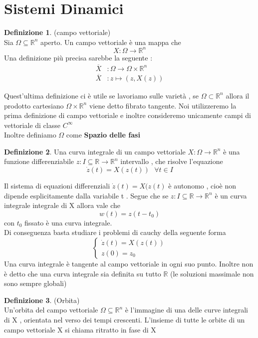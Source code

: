 \documentclass{article}
\theoremstyle{definition}
\newtheorem{definizione}{Definizione}[section]
\newcommand{\R}{\mathbb{R}}
\newcommand{\Rn}{\R^n}
\begin{document}
\section{Sistemi Dinamici}
\begin{definizione}(campo vettoriale)\\
	Sia $\Omega \subseteq \Rn$ aperto. Un campo vettoriale è una mappa che $$X:\Omega \rightarrow \Rn$$
	Una definizione più precisa sarebbe la seguente :
	\begin{align*}
		\overline{X}&: \Omega \rightarrow \Omega \times \Rn \\
		\overline{X} &:z \mapsto (z,X(z))
	\end{align*}
\end{definizione}
Quest'ultima definizione ci è utile se lavoriamo sulle varietà , se $\Omega\subset \Rn$ allora il prodotto cartesiano $\Omega \times \Rn $ viene detto fibrato tangente. Noi utilizzeremo la prima definizione di campo vettoriale e inoltre consideremo unicamente campi di vettoriale di classe $C^{\infty}$\\
Inoltre definiamo $\Omega$ come \textbf{Spazio delle fasi}
\begin{definizione}
	Una curva integrale di un campo vettoriale $X:\Omega \rightarrow \Rn$ è una funzione differenziabile $z:I \subseteq \R  \rightarrow \Rn$ intervallo , che risolve l'equazione $$\dot{z}(t)=X(z(t)) \ \ \ \forall t \in I$$
\end{definizione}
Il sistema di equazioni differenziali $\dot{z}(t)=X(z(t)$ è autonomo , cioè non dipende esplicitamente dalla variabile t . Segue che se $z:I \subseteq \R  \rightarrow \Rn$ è un curva integrale integrale di X allora vale che 
$$w(t)=z(t-t_0)$$ con $t_0$ fissato è una curva integrale. \\
Di conseguenza basta studiare i problemi di cauchy della seguente forma 
$$\begin{cases}
	\dot{z}(t)=X(z(t)) \\
	z(0)=z_0
\end{cases}$$
Una curva integrale è tangente al campo vettoriale in ogni suo punto. Inoltre non è detto che una curva integrale sia definita su tutto $\R$ (le soluzioni massimale non sono sempre globali)
\begin{definizione}(Orbita)\\
	Un'orbita del campo vettoriale $\Omega \subseteq \Rn$ è l'immagine di una delle curve integrali di X , orientata nel verso dei tempi crescenti. L'insieme di tutte le orbite di un campo vettoriale X si chiama ritratto in fase di X 
\end{definizione}
\end{document}
